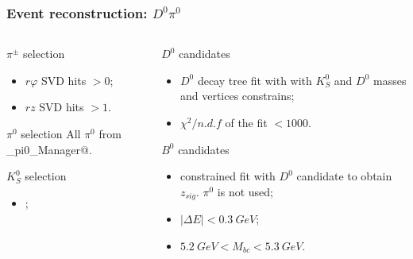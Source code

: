 \documentclass[10 pt,compress,mathserif]{beamer}
\begin{document}
\begin{frame}[containsverbatim]
 \frametitle{Event reconstruction: $D^0\pi^0$}
 \begin{columns}
  \begin{column}{0.5\textwidth}
   \begin{block}{$\pi^{\pm}$ selection}
  \begin{itemize}
   \item $r\varphi$ SVD hits $>0$;
   \item $rz$ SVD hits $>1$.
  \end{itemize}
 \end{block}
 \begin{block}{$\pi^0$ selection}
  All $\pi^0$ from \verb@Mdst_pi0_Manager@.
 \end{block}
 \begin{block}{$K_S^0$ selection}
 \begin{itemize}
  \item \verb@nisKsFinder@;
 \end{itemize}
 \end{block}
  \end{column}
  \begin{column}{0.5\textwidth}
   \begin{block}{$D^0$ candidates}
    \begin{itemize}
     \item $D^0$ decay tree fit with \verb@ExKFitter@ with $K_S^0$ and $D^0$ masses and vertices constrains;
     \item $\chi^2/n.d.f$ of the fit $<1000$.
    \end{itemize}
   \end{block}
   \begin{block}{$B^0$ candidates}
    \begin{itemize}
     \item \verb@IPTube@ constrained fit with $D^0$ candidate to obtain $z_{sig}$. $\pi^0$ is not used;
     \item $\left|\Delta E\right| < 0.3\ GeV$;
     \item $5.2\ GeV < M_{bc} < 5.3\ GeV$.
    \end{itemize}
   \end{block}
  \end{column}
 \end{columns}
\end{frame}
\end{document}
